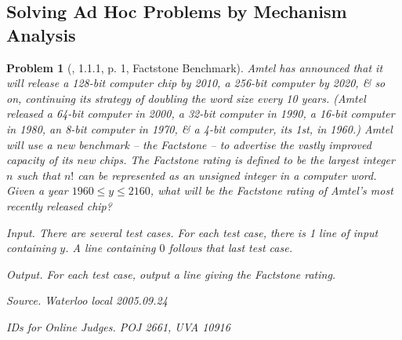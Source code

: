 \documentclass{article}
\newtheorem{problem}{Problem}
\begin{document}

\subsection{Solving Ad Hoc Problems by Mechanism Analysis}

\begin{problem}[\cite{Wu_Wang2018}, 1.1.1, p. 1, Factstone Benchmark]
	{\sc Amtel} has announced that it will release a 128-bit computer chip by 2010, a 256-bit computer by 2020, \& so on, continuing its strategy of doubling the word size every 10 years. ({\sc Amtel} released a 64-bit computer in 2000, a 32-bit computer in 1990, a 16-bit computer in 1980, an 8-bit computer in 1970, \& a 4-bit computer, its 1st, in 1960.) {\sc Amtel} will use a new benchmark -- the {\rm Factstone} -- to advertise the vastly improved capacity of its new chips. The {\rm Factstone} rating is defined to be the largest integer $n$ such that $n!$ can be represented as an unsigned integer in a computer word. Given a year $1960\le y\le2160$, what will be the {\rm Factstone} rating of {\sc Amtel}'s most recently released chip?
	\item {\sf Input.} There are several test cases. For each test case, there is 1 line of input containing $y$. A line containing $0$ follows that last test case.
	\item {\sf Output.} For each test case, output a line giving the Factstone rating.
	\item {\sf Source.} Waterloo local 2005.09.24
	\item {\sf IDs for Online Judges.} POJ 2661, UVA 10916
\end{problem}
\end{document}
